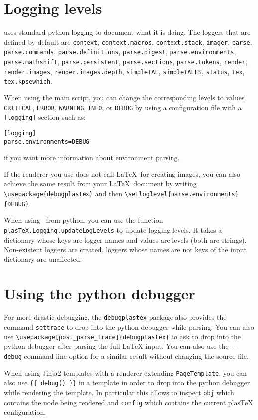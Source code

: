 \section{Logging levels}
\label{sec:logging-levels}

\plasTeX uses standard python logging to document what it is doing. The
loggers that are defined by default are
\verb+context+,
\verb+context.macros+,
\verb+context.stack+,
\verb+imager+,
\verb+parse+,
\verb+parse.commands+,
\verb+parse.definitions+,
\verb+parse.digest+,
\verb+parse.environments+,
\verb+parse.mathshift+,
\verb+parse.persistent+,
\verb+parse.sections+,
\verb+parse.tokens+,
\verb+render+,
\verb+render.images+,
\verb+render.images.depth+,
\verb+simpleTAL+,
\verb+simpleTALES+,
\verb+status+,
\verb+tex+,
\verb+tex.kpsewhich+.

When using the main  script, you can change the
corresponding levels to values \verb+CRITICAL+, \verb+ERROR+,
\verb+WARNING+, \verb+INFO+, or \verb+DEBUG+ by using a configuration
file with a \verb+[logging]+ section such as:
\begin{verbatim}
[logging]
parse.environments=DEBUG
\end{verbatim}
if you want more information about environment parsing.

If the renderer you use does not call \LaTeX\ for creating images, you
can also achieve the same result from your \LaTeX\ document
by writing \verb+\usepackage{debugplastex}+ and then
\verb+\setloglevel{parse.environments}{DEBUG}+.

When using \plasTeX\ from python, you can use the function
\verb+plasTeX.Logging.updateLogLevels+ to update logging levels. It takes
a dictionary whose keys are logger names and values are levels (both are
strings). Non-existent loggers are created, loggers whose names are not
keys of the input dictionary are unaffected.


\section{Using the python debugger}

For more drastic debugging, the \verb+debugplastex+ package also
provides the command \verb+settrace+ to drop into the python debugger
while parsing. You can also use
\verb+\usepackage[post_parse_trace]{debugplastex}+ to ask \plasTeX
to drop into the python debugger after parsing the full LaTeX input.
You can also use the \verb+--debug+ command line option for a similar result
without changing the source file.

When using Jinja2 templates with a renderer extending
\verb+PageTemplate+, you can also use \verb+{{ debug() }}+ in a template in
order to drop into the python debugger while rendering the template. In
particular this allows to inspect \verb+obj+ which contains
the node being rendered and \verb+config+ which contains the current
plasTeX configuration.
